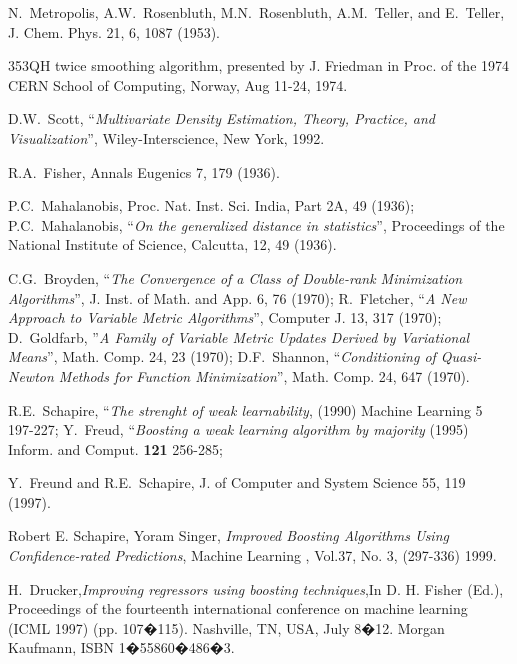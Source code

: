 \begin{thebibliography}{99}
  N.~Metropolis, A.W.~Rosenbluth, M.N.~Rosenbluth, A.M.~Teller, 
                        and E.~Teller,
                        J. Chem. Phys. 21, 6, 1087 (1953).

         353QH twice smoothing algorithm, 
                        presented by J. Friedman in Proc. of the 1974 CERN School of 
                        Computing, Norway, Aug 11-24, 1974.

         D.W.~Scott, ``{\em Multivariate Density Estimation, Theory, Practice, 
                        and Visualization}'', Wiley-Interscience, New York, 1992.

        R.A.~Fisher, Annals Eugenics 7, 179 (1936).

   P.C.~Mahalanobis, Proc. Nat. Inst. Sci. India, Part 2A, 49 (1936);
                        P.C.~Mahalanobis, 
                        ``{\em On the generalized distance in statistics}'', 
                        Proceedings of the National Institute of Science, Calcutta, 
                        12, 49 (1936).

         C.G.~Broyden, ``{\em The Convergence of a Class of Double-rank Minimization Algorithms}'', J. Inst. of Math. and App. 6, 76 (1970); R.~Fletcher, ``{\em A New Approach to Variable Metric Algorithms}'', Computer J. 13, 317 (1970);
D.~Goldfarb, ''{\em A Family of Variable Metric Updates Derived by Variational Means}'', Math. Comp. 24, 23 (1970); D.F.~Shannon, ``{\em Conditioning of Quasi-Newton Methods for Function Minimization}'', Math. Comp. 24, 647 (1970).

      R.E.~Schapire, ``{\em The strenght of weak learnability}, (1990) Machine Learning 5 197-227;
                        Y.~Freud, ``{\em Boosting a weak learning algorithm by majority} (1995) Inform. and Comput. {\bf 121} 256-285;

      Y.~Freund and R.E.~Schapire, J. of Computer and System Science 
                        55, 119 (1997).

  Robert E. Schapire, Yoram Singer, {\em Improved Boosting Algorithms Using Confidence-rated Predictions},  Machine Learning , Vol.37, No. 3, (297-336) 1999.
 
 H.~Drucker,{\em Improving regressors using
  boosting techniques},In D. H. Fisher (Ed.), Proceedings of the
  fourteenth international conference on machine learning (ICML 1997)
  (pp. 107�115). Nashville, TN, USA, July 8�12. Morgan Kaufmann, ISBN
  1�55860�486�3.


\end{thebibliography}
